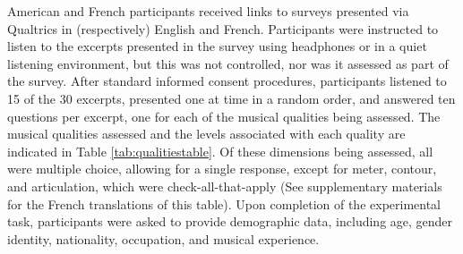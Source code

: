 \documentclass[
  english,
  man]{apa6}
\begin{document}
American and French participants received links to surveys presented via Qualtrics in (respectively) English and French. Participants were instructed to listen to the excerpts presented in the survey using headphones or in a quiet listening environment, but this was not controlled, nor was it assessed as part of the survey. After standard informed consent procedures, participants listened to 15 of the 30 excerpts, presented one at time in a random order, and answered ten questions per excerpt, one for each of the musical qualities being assessed. The musical qualities assessed and the levels associated with each quality are indicated in Table \ref{tab:qualitiestable}. Of these dimensions being assessed, all were multiple choice, allowing for a single response, except for meter, contour, and articulation, which were check-all-that-apply (See supplementary materials for the French translations of this table). Upon completion of the experimental task, participants were asked to provide demographic data, including age, gender identity, nationality, occupation, and musical experience.
\end{document}
